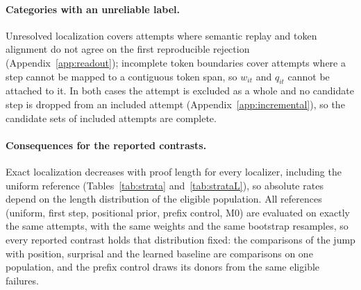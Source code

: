\paragraph{Categories with an unreliable label.} Unresolved localization covers attempts where semantic replay and token alignment do not agree on the first reproducible rejection (Appendix~\ref{app:readout}); incomplete token boundaries cover attempts where a step cannot be mapped to a contiguous token span, so $w_{it}$ and $q_{it}$ cannot be attached to it. In both cases the attempt is excluded as a whole and no candidate step is dropped from an included attempt (Appendix~\ref{app:incremental}), so the candidate sets of included attempts are complete.

\paragraph{Consequences for the reported contrasts.} Exact localization decreases with proof length for every localizer, including the uniform reference (Tables~\ref{tab:strata} and~\ref{tab:strataL}), so absolute rates depend on the length distribution of the eligible population. All references (uniform, first step, positional prior, prefix control, M0) are evaluated on exactly the same attempts, with the same weights and the same bootstrap resamples, so every reported contrast holds that distribution fixed: the comparisons of the jump with position, surprisal and the learned baseline are comparisons on one population, and the prefix control draws its donors from the same eligible failures.
